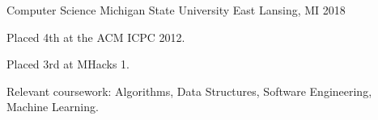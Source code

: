 
\begin{cventries}

  \cventry
    {Computer Science}
    {Michigan State University}
    {East Lansing, MI}
    {2018}
    {
      \begin{cvitems}
        \item {Placed 4th at the ACM ICPC 2012.}
        \item {Placed 3rd at MHacks 1.}
        \item {Relevant coursework: Algorithms, Data Structures, Software Engineering, Machine Learning.}
      \end{cvitems}
    }

\end{cventries}
